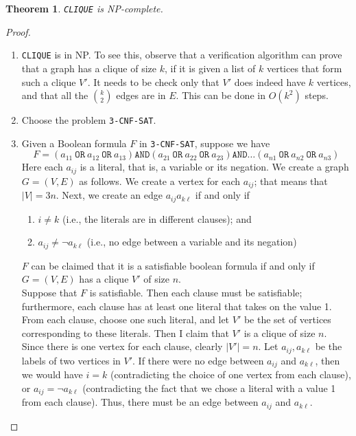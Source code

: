 \documentclass[12pt]{article}
\theoremstyle{plain}
\newtheorem{theorem}{Theorem}[subsection]
\theoremstyle{definition}
\begin{document}
\begin{theorem}
\texttt{CLIQUE} is NP-complete.
\end{theorem}
\begin{proof}
\begin{enumerate}
  \item[1.] \texttt{CLIQUE} is in NP.
  To see this, observe that a verification algorithm can prove that a graph has a clique of size $k$, if it is given a list of $k$ vertices that form such a clique $V'$.
  It needs to be check only that $V'$ does indeed have $k$ vertices, and that all the ${k \choose 2}$ edges are in $E$.
  This can be done in $O(k^{2})$ steps.

  \item[2.] Choose the problem \texttt{3-CNF-SAT}.

  \item[3.] Given a Boolean formula $F$ in \texttt{3-CNF-SAT}, suppose we have
  $$F = (a_{11}~\texttt{OR}~a_{12}~\texttt{OR}~a_{13})\texttt{AND}(a_{21}~\texttt{OR}~a_{22}~\texttt{OR}~a_{23})\texttt{AND}\dots(a_{n1}~\texttt{OR}~a_{n2}~\texttt{OR}~a_{n3})$$
  Here each $a_{ij}$ is a literal, that is, a variable or its negation.
  We create a graph $G = (V, E)$ as follows.
  We create a vertex for each $a_{ij}$;
  that means that $|V| = 3n$.
  Next, we create an edge $a_{ij}a_{k\ell}$ if and only if
  \begin{enumerate}
    \item $i \neq k$ (i.e., the literals are in different clauses); and
    \item $a_{ij} \neq \neg a_{k\ell}$ (i.e., no edge between a variable and its negation)
  \end{enumerate}
  $F$ can be claimed that it is a satisfiable boolean formula if and only if $G = (V, E)$ has a clique $V'$ of size $n$. \\

  Suppose that $F$ is satisfiable.
  Then each clause must be satisfiable;
  furthermore, each clause has at least one literal that takes on the value 1.
  From each clause, choose one such literal, and let $V'$ be the set of vertices corresponding to these literals.
  Then I claim that $V'$ is a clique of size $n$.
  Since there is one vertex for each clause, clearly $|V'| = n$.
  Let $a_{ij}, a_{k\ell}$ be the labels of two vertices in $V'$.
  If there were no edge between $a_{ij}$ and $a_{k\ell}$, then we would have $i = k$ (contradicting the choice of one vertex from each clause), or $a_{ij} = \neg a_{k\ell}$ (contradicting the fact that we chose a literal with a value 1 from each clause).
  Thus, there must be an edge between $a_{ij}$ and $a_{k\ell}$. \\


\end{enumerate}
\end{proof}
\end{document}
